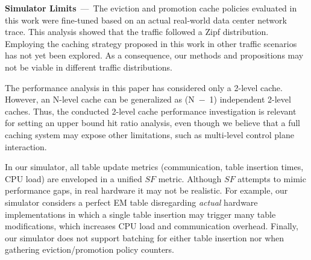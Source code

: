 \textbf{Simulator Limits}~---~The eviction and promotion cache policies evaluated in this work were fine-tuned based on an actual real-world data center network trace.
This analysis showed that the traffic followed a Zipf distribution.
Employing the caching strategy proposed in this work in other traffic scenarios has not yet been explored.
As a consequence, our methods and propositions may not be viable in different traffic distributions.

The performance analysis in this paper has considered only a 2-level cache.
However, an N-level cache can be generalized as (N~$-$~1) independent 2-level caches.
Thus, the conducted 2-level cache performance investigation is relevant for setting an upper bound hit ratio analysis, even though we believe that a full caching system may expose other limitations, such as multi-level control plane interaction.

In our simulator, all table update metrics (communication, table insertion times, CPU load) are enveloped in a unified $SF$ metric.
Although $SF$ attempts to mimic performance gaps, in real hardware it may not be realistic.
For example, our simulator considers a perfect EM table disregarding \textit{actual} hardware implementations in which a single table insertion may trigger many table modifications, which increases CPU load and communication overhead.
Finally, our simulator does not support batching for either table insertion nor when gathering eviction/promotion policy counters.

